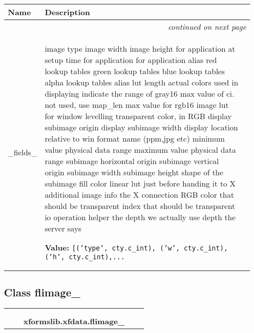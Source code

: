     \vspace{-1cm}
\hspace{\varindent}\begin{longtable}{|p{\varnamewidth}|p{\vardescrwidth}|l}
\cline{1-2}
\cline{1-2} \centering \textbf{Name} & \centering \textbf{Description}& \\
\cline{1-2}
\endhead\cline{1-2}\multicolumn{3}{r}{\small\textit{continued on next page}}\\\endfoot\cline{1-2}
\endlastfoot\raggedright \_\-f\-i\-e\-l\-d\-s\-\_\- & \raggedright image type
image width
image height
for application at setup time
for application
for application
alias
red lookup tables
green lookup tables
blue lookup tables
alpha lookup tables
alias
lut length
actual colors used in displaying
indicate the range of gray16
max value of ci. not used, use map\_len
max value for rgb16 image
lut for window levelling
transparent color, in RGB
display subimage origin
display subimage width
display location relative to win
format name (ppm,jpg etc)
minimum value physical data range
maximum value physical data range
subimage horizontal origin
subimage vertical origin
subimage width
subimage height
shape of the subimage
fill color
linear lut
just before handing it to X
additional image info
the X connection
RGB color that should be transparent
index that should be transparent
io operation helper
the depth we actually use
depth the server says

\textbf{Value:} 
{\tt [('type', cty.c\_int), ('w', cty.c\_int), ('h', cty.c\_int),\texttt{...}}&\\
\cline{1-2}
\end{longtable}



\subsection{Class flimage\_}

    \label{xformslib:xfdata:flimage_}
\begin{tabular}{cccccc}
\multicolumn{2}{r}{\settowidth{\BCL}{ctypes.Structure}\multirow{2}{\BCL}{ctypes.Structure}}
&&
  \\\cline{3-3}
  &&\multicolumn{1}{c|}{}
&&
  \\
&&\multicolumn{2}{l}{\textbf{xformslib.xfdata.flimage\_}}
\end{tabular}


